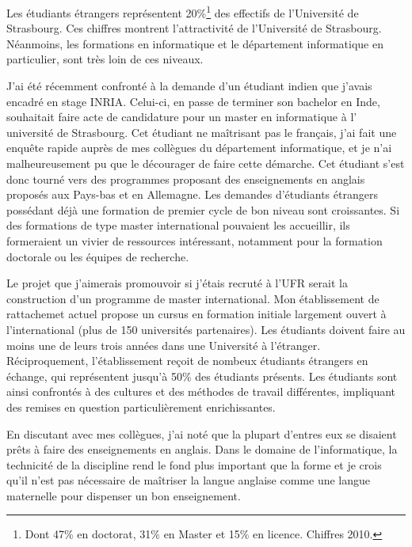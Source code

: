 \documentclass[11pt]{article}
\begin{document}
Les étudiants étrangers représentent 20\%\footnote{Dont 47\% en doctorat, 31\% 
en Master et 15\% en licence. Chiffres 2010.} des effectifs de l'Université de 
Strasbourg. Ces chiffres montrent l'attractivité de l'Université de Strasbourg. 
Néanmoins, les formations en informatique et le département informatique en 
particulier, sont très loin de ces niveaux.

J'ai été récemment confronté à la demande d'un étudiant indien que j'avais 
encadré en stage INRIA. Celui-ci, en passe de terminer son bachelor en Inde, 
souhaitait faire acte de candidature pour un master en informatique à l'
université de Strasbourg. Cet étudiant ne maîtrisant pas le français, j'ai fait 
une enquête rapide auprès de mes collègues du département informatique, et je 
n'ai malheureusement pu que le décourager de faire cette démarche. Cet étudiant 
s'est donc tourné vers des programmes proposant des enseignements en anglais 
proposés aux Pays-bas et en Allemagne. Les demandes d'étudiants étrangers 
possédant déjà une formation de premier cycle de bon niveau sont croissantes. 
Si des formations de type master international pouvaient les accueillir, ils 
formeraient un vivier de ressources intéressant, notamment pour la formation 
doctorale ou les équipes de recherche. 

Le projet que j'aimerais promouvoir si j'étais recruté à l'UFR serait la 
construction d'un programme de master international. Mon établissement de 
rattachemet actuel propose un cursus en formation initiale largement ouvert 
à l'international (plus de 150 universités partenaires). Les étudiants doivent 
faire au moins une de leurs trois années dans une Université à l'étranger.
Réciproquement, l'établissement reçoit de nombeux étudiants étrangers en échange, 
qui représentent jusqu'à 50\% des étudiants présents. Les étudiants sont ainsi 
confrontés à des cultures et des méthodes de travail différentes, impliquant 
des remises en question particulièrement enrichissantes.

En discutant avec mes collègues, j'ai noté que la plupart d'entres eux 
se disaient prêts à faire des enseignements en anglais. Dans le domaine de 
l'informatique, la technicité de la discipline rend le fond plus important que 
la forme et je crois qu'il n'est pas nécessaire de maîtriser la langue anglaise 
comme une langue maternelle pour dispenser un bon enseignement.
\end{document}
